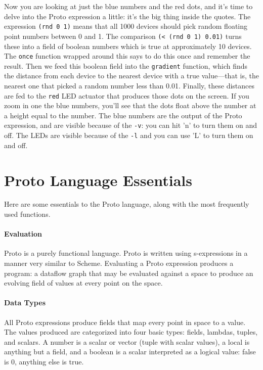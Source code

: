 \documentclass{article}
\newcommand\var[1]{{\tt #1}}
\begin{document}
Now you are looking at just the blue numbers and the red dots, and
it's time to delve into the Proto expression a little: it's the big
thing inside the quotes.  The expression \var{(rnd 0 1)} means that
all 1000 devices should pick random floating point numbers between 0
and 1.  The comparison \var{(< (rnd 0 1) 0.01)} turns these into a
field of boolean numbers which is true at approximately 10 devices.
The \var{once} function wrapped around this says to do this once and
remember the result.  Then we feed this boolean field into the
\var{gradient} function, which finds the distance from each device to
the nearest device with a true value---that is, the nearest one that
picked a random number less than 0.01.  Finally, these distances are
fed to the \var{red} LED actuator that produces those dots on the
screen.  If you zoom in one the blue numbers, you'll see that the dots
float above the number at a height equal to the number.  The blue
numbers are the output of the Proto expression, and are visible
because of the \var{-v}: you can hit 'n' to turn them on and off.  The
LEDs are visible because of the \var{-l} and you can use 'L' to turn
them on and off.

\section{Proto Language Essentials}

Here are some essentials to the Proto language, along with the
most frequently used functions.

\paragraph{Evaluation}

Proto is a purely functional language.  Proto is written using
s-expressions in a manner very similar to Scheme.  Evaluating a Proto
expression produces a program: a dataflow graph that may be evaluated
against a space to produce an evolving field of values at every point
on the space.

\paragraph{Data Types}

All Proto expressions produce fields that map every point in space to
a value.  The values produced are categorized into four basic types:
fields, lambdas, tuples, and scalars.  A number is a scalar or vector
(tuple with scalar values), a local is anything but a field, and a
boolean is a scalar interpreted as a logical value: false is 0,
anything else is true.
\end{document}
